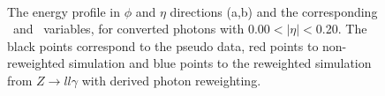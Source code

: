 \begin{figure}[htbp]
    \centering
	 \\
    \caption{The energy profile in $\phi$ and $\eta$ directions (a,b) and the corresponding \Rphi \ and \Reta \ variables, for converted photons with 0.00$<|\eta|<$0.20. The black points correspond to the pseudo data, red points to non-reweighted simulation and blue points to the reweighted simulation from $Z\rightarrow ll\gamma$ with derived photon reweighting.}
    \label{Photon:3}
\end{figure}

